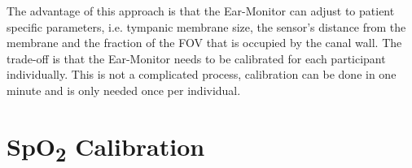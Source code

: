 \medskip

The advantage of this approach is that the Ear-Monitor can adjust to patient specific parameters, i.e. tympanic membrane size, the sensor's distance from the membrane and the fraction of the FOV that is occupied by the canal wall. The trade-off is that the Ear-Monitor needs to be calibrated for each participant individually. This is not a complicated process, calibration can be done in one minute and is only needed once per individual. 

\section{SpO\textsubscript{2} Calibration}











